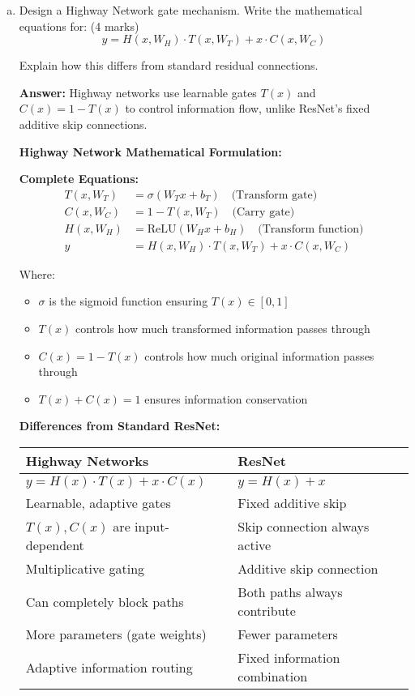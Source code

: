 \documentclass[12pt]{article}
\newcommand{\answer}[1]{{\color{answercolor}\textbf{Answer:} #1}}
\newcommand{\explanation}[1]{{\color{explanationcolor}#1}}
\begin{document}
\begin{enumerate}[(a)]
    \item Design a Highway Network gate mechanism. Write the mathematical equations for: \hfill (4 marks)
    $$y = H(x,W_H) \cdot T(x,W_T) + x \cdot C(x,W_C)$$
    
    Explain how this differs from standard residual connections.
    
    \answer{Highway networks use learnable gates $T(x)$ and $C(x) = 1-T(x)$ to control information flow, unlike ResNet's fixed additive skip connections.}
    
    \explanation{
    \textbf{Highway Network Mathematical Formulation:}
    
    \textbf{Complete Equations:}
    \begin{align}
    T(x, W_T) &= \sigma(W_T x + b_T) \quad \text{(Transform gate)} \\
    C(x, W_C) &= 1 - T(x, W_T) \quad \text{(Carry gate)} \\
    H(x, W_H) &= \text{ReLU}(W_H x + b_H) \quad \text{(Transform function)} \\
    y &= H(x, W_H) \cdot T(x, W_T) + x \cdot C(x, W_C)
    \end{align}
    
    Where:
    \begin{itemize}
        \item $\sigma$ is the sigmoid function ensuring $T(x) \in [0,1]$
        \item $T(x)$ controls how much transformed information passes through
        \item $C(x) = 1 - T(x)$ controls how much original information passes through
        \item $T(x) + C(x) = 1$ ensures information conservation
    \end{itemize}
    
    \textbf{Differences from Standard ResNet:}
    
    \begin{tabular}{|p{5cm}|p{5cm}|}
    \hline
    \textbf{Highway Networks} & \textbf{ResNet} \\
    \hline
    $y = H(x) \cdot T(x) + x \cdot C(x)$ & $y = H(x) + x$ \\
    \hline
    Learnable, adaptive gates & Fixed additive skip \\
    \hline
    $T(x), C(x)$ are input-dependent & Skip connection always active \\
    \hline
    Multiplicative gating & Additive skip connection \\
    \hline
    Can completely block paths & Both paths always contribute \\
    \hline
    More parameters (gate weights) & Fewer parameters \\
    \hline
    Adaptive information routing & Fixed information combination \\
    \hline
    \end{tabular}
    
}
\end{enumerate}
\end{document}
